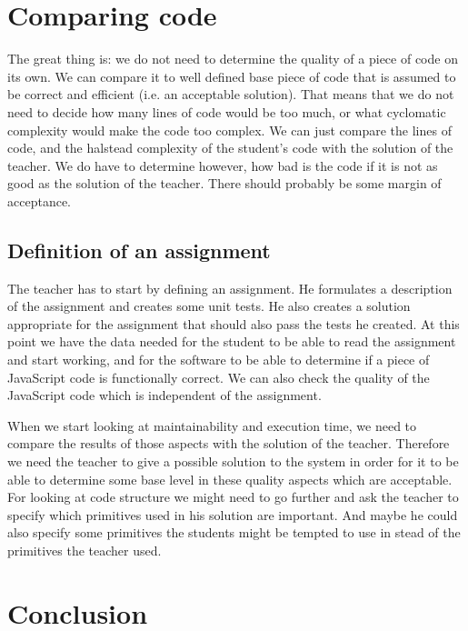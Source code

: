 \documentclass{article}
\begin{document}
\section{Comparing code}

The great thing is: we do not need to determine the quality of a piece of code
on its own. We can compare it to well defined base piece of code that is
assumed to be correct and efficient (i.e. an acceptable solution). That means
that we do not need to decide how many lines of code would be too much, or what
cyclomatic complexity would make the code too complex. We can just compare the
lines of code, and the halstead complexity of the student's code with the
solution of the teacher. We do have to determine however, how bad is the code
if it is not as good as the solution of the teacher. There should probably be
some margin of acceptance.

\subsection{Definition of an assignment}
The teacher has to start by defining an assignment. He formulates a description
of the assignment and creates some unit tests. He also creates a solution
appropriate for the assignment that should also pass the tests he created. At
this point we have the data needed for the student to be able to read the
assignment and start working, and for the software to be able to determine if a
piece of JavaScript code is functionally correct. We can also check the quality
of the JavaScript code which is independent of the assignment.

When we start looking at maintainability and execution time, we need to compare
the results of those aspects with the solution of the teacher. Therefore we
need the teacher to give a possible solution to the system in order for it to
be able to determine some base level in these quality aspects which are
acceptable. For looking at code structure we might need to go further and ask the teacher to specify which primitives used in his solution are important. And maybe he could also specify some primitives the students might be tempted to use in stead of the primitives the teacher used.

\section{Conclusion}



\end{document}
